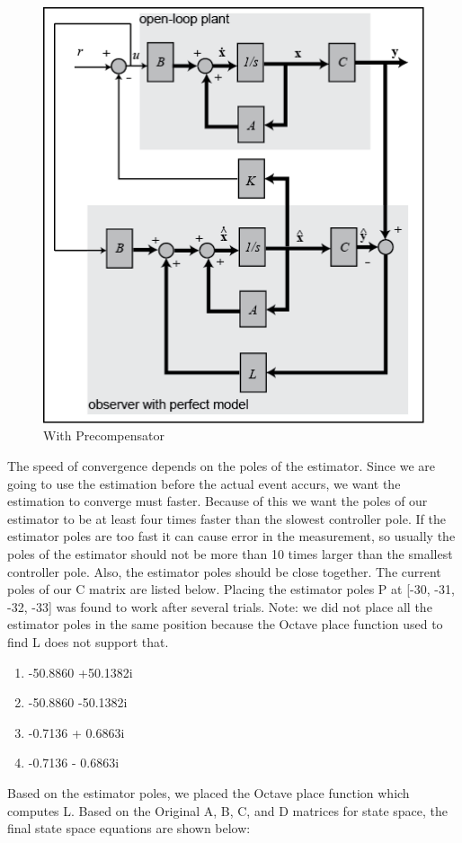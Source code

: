 \documentclass{article}
\begin{document}
\begin{eqaution}
\begin{eqaution}
\begin{figure}[!htb]
  \includegraphics[width=.6\linewidth]{observer_blockd}
  \caption{With Precompensator}
  \label{bd2}
\end{figure}


\clearpage

The speed of convergence depends on the poles of the estimator. Since we are going to use the estimation before the actual event accurs, we want the estimation to converge must faster. Because of this we want the poles of our estimator to be at least four times faster than the slowest controller pole. If the estimator poles are too fast it can cause error in the measurement, so usually the poles of the estimator should not be more than 10 times larger than the smallest controller pole. Also, the estimator poles should be close together. The current poles of our C matrix are listed below. Placing the estimator poles P at [-30, -31, -32, -33] was found to work after several trials. Note: we did not place all the estimator poles in the same position because the Octave place function used to find L does not support that.
\begin{enumerate}
  \item  -50.8860 +50.1382i
  \item -50.8860 -50.1382i
  \item -0.7136 + 0.6863i
  \item -0.7136 - 0.6863i
\end{enumerate}

Based on the estimator poles, we placed the Octave place function which computes L. Based on the Original A, B, C, and D matrices for state space, the final state space equations are shown below:


\end{eqaution}
\end{eqaution}
\end{document}
